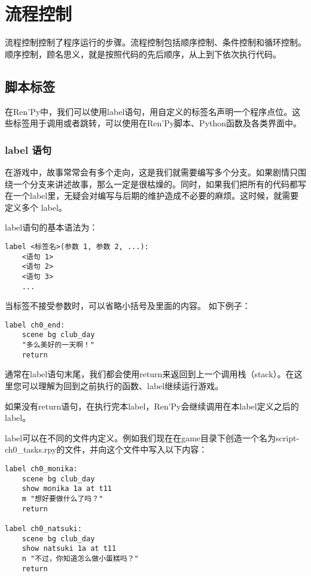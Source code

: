 \section{流程控制}
流程控制控制了程序运行的步骤。流程控制包括顺序控制、条件控制和循环控制。顺序控制，顾名思义，就是按照代码的先后顺序，从上到下依次执行代码。

\subsection{脚本标签}
在Ren'Py中，我们可以使用label语句，用自定义的标签名声明一个程序点位。这些标签用于调用或者跳转，可以使用在Ren'Py脚本、Python函数及各类界面中。

\subsubsection{label 语句}
在游戏中，故事常常会有多个走向，这是我们就需要编写多个分支。如果剧情只围绕一个分支来讲述故事，那么一定是很枯燥的。同时，如果我们把所有的代码都写在一个label里，无疑会对编写与后期的维护造成不必要的麻烦。这时候，就需要定义多个 label。

label语句的基本语法为：
\begin{lstlisting}
label <标签名>(参数 1, 参数 2, ...):
    <语句 1>
    <语句 2>
    <语句 3>
    ...
\end{lstlisting}

当标签不接受参数时，可以省略小括号及里面的内容。
如下例子：
\begin{lstlisting}
label ch0_end:
    scene bg club_day
    "多么美好的一天啊！"
    return
\end{lstlisting}

\begin{Warning}
    通常在label语句末尾，我们都会使用return来返回到上一个调用栈（stack）。在这里您可以理解为回到之前执行的函数、label继续运行游戏。

    如果没有return语句，在执行完本label，Ren'Py会继续调用在本label定义之后的label。
\end{Warning}

label可以在不同的文件内定义。例如我们现在在game目录下创造一个名为script-ch0\_tasks.rpy的文件，并向这个文件中写入以下内容：
\begin{lstlisting}[caption=script-ch0\_tasks.rpy]
label ch0_monika:
    scene bg club_day
    show monika 1a at t11
    m "想好要做什么了吗？"
    return

label ch0_natsuki:
    scene bg club_day
    show natsuki 1a at t11
    n "不过，你知道怎么做小蛋糕吗？"
    return
\end{lstlisting}

